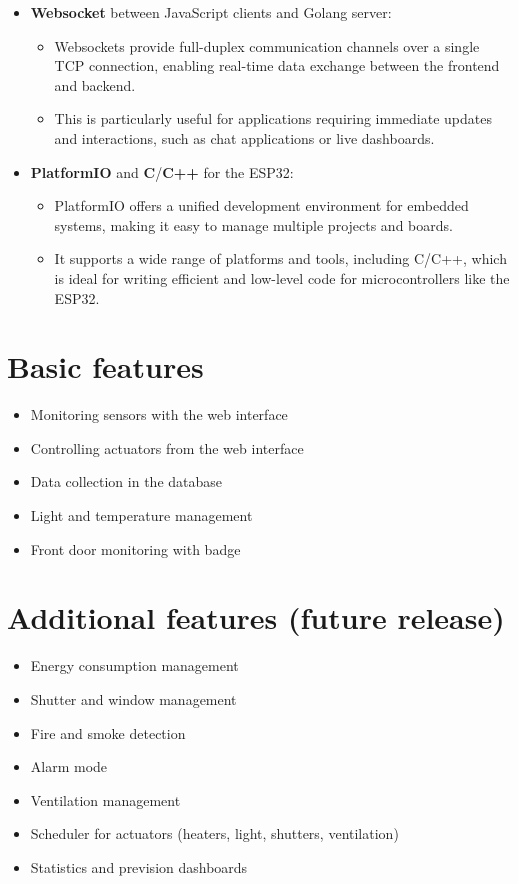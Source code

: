 \documentclass{report}
\begin{document}
\begin{itemize}
    \item \textbf{Websocket} between JavaScript clients and Golang server:
        \begin{itemize}
        \item Websockets provide full-duplex communication channels over a single TCP connection, enabling real-time data exchange between the frontend and backend.
        \item This is particularly useful for applications requiring immediate updates and interactions, such as chat applications or live dashboards.
        \end{itemize}

    \item \textbf{PlatformIO} and \textbf{C}/\textbf{C++} for the ESP32:
        \begin{itemize}
        \item PlatformIO offers a unified development environment for embedded systems, making it easy to manage multiple projects and boards.
        \item It supports a wide range of platforms and tools, including C/C++, which is ideal for writing efficient and low-level code for microcontrollers like the ESP32.
        \end{itemize}
\end{itemize}

\section{Basic features}\label{sec:basic-features}

\begin{itemize}
    \item Monitoring sensors with the web interface
    \item Controlling actuators from the web interface
    \item Data collection in the database
    \item Light and temperature management
    \item Front door monitoring with  badge
\end{itemize}

\section{Additional features (future release)}\label{sec:additional-features-(future-release)}

\begin{itemize}
    \item Energy consumption management
    \item Shutter and window management
    \item Fire and smoke detection
    \item Alarm mode
    \item Ventilation management
    \item Scheduler for actuators (heaters, light, shutters, ventilation)
    \item Statistics and prevision dashboards
\end{itemize}
\end{document}
